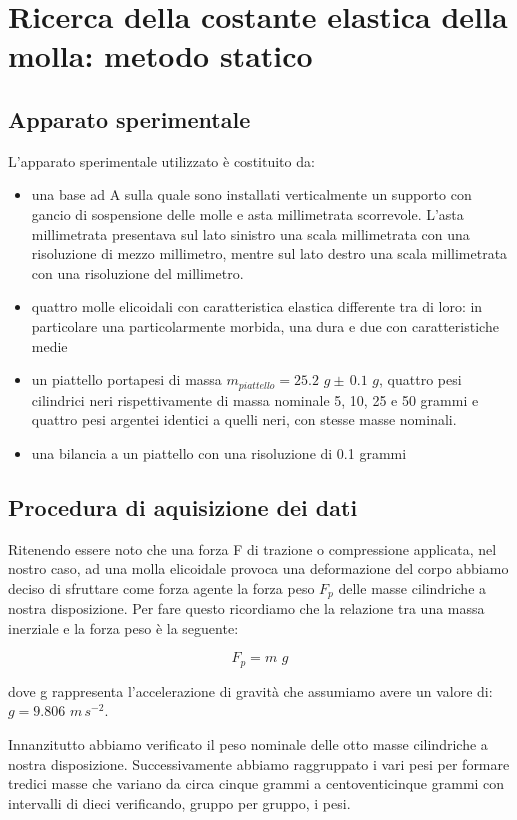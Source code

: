 \section{Ricerca della costante elastica della molla: metodo statico}

\subsection{Apparato sperimentale}
L'apparato sperimentale utilizzato è costituito da:
	\begin{itemize}
		\item{una base ad A sulla quale sono installati verticalmente un supporto con gancio di sospensione delle molle e asta millimetrata scorrevole. L'asta millimetrata presentava sul lato sinistro una scala millimetrata con una risoluzione di mezzo millimetro, mentre sul lato destro una scala millimetrata con una risoluzione del millimetro.}
		\item{quattro molle elicoidali con caratteristica elastica differente tra di loro: in particolare una particolarmente morbida, una dura e due con caratteristiche medie}
		\item{un piattello portapesi di massa $m_{piattello} = 25.2\,\,g \pm\, 0.1\,\,g$, quattro pesi cilindrici neri rispettivamente di massa nominale 5, 10, 25 e 50 grammi e quattro pesi argentei identici a quelli neri, con stesse masse nominali.}
		\item{una bilancia a un piattello con una risoluzione di 0.1 grammi}
	\end{itemize}

\subsection{Procedura di aquisizione dei dati}
Ritenendo essere noto che una forza F di trazione o compressione applicata, nel nostro caso, ad una molla elicoidale provoca una deformazione del corpo abbiamo deciso di sfruttare come forza agente la forza peso $F_{p}$ delle masse cilindriche a nostra disposizione. Per fare questo ricordiamo che la relazione tra una massa inerziale e la forza peso è la seguente:

\begin{equation}
	F_{p} = m\,\,g
\end{equation}

dove g rappresenta l'accelerazione di gravità che assumiamo avere un valore di: $g = 9.806\,\,m\,s^{-2}$.

Innanzitutto abbiamo verificato il peso nominale delle otto masse cilindriche a nostra disposizione. Successivamente abbiamo raggruppato i vari pesi per formare tredici masse che variano da circa cinque grammi a centoventicinque grammi con intervalli di dieci verificando, gruppo per gruppo, i pesi.\\

